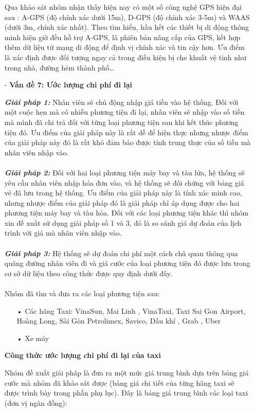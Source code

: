\documentclass[a4paper]{article}
\begin{document}
\begin{itemize}
    Qua khảo sát nhóm nhận thấy hiện nay có một số công nghệ GPS hiện đại sau : A-GPS (độ chính xác dưới 15m), D-GPS (độ chính xác 3-5m) và WAAS (dưới 3m, chính xác nhất). Theo tìm hiểu, hầu hết các thiết bị di động thông minh hiện giờ đều hỗ trợ A-GPS, là phiên bản nâng cấp của GPS,  kết hợp thêm dữ liệu từ mạng di động để định vị chính xác và tin cậy hơn. Ưu điểm là xác định được đối tượng ngay cả trong điều kiện bị che khuất vệ tinh như trong nhà, đường hẻm thành phố…
    \item[-] \textbf{Vấn đề 7: Ước lượng chi phí đi lại}\par
    \textit{\textbf{Giải pháp 1:}} Nhân viên sẽ chủ động nhập giá tiền vào hệ thống. Đối với một cuộc hẹn mà có nhiều phương tiện đi lại, nhân viên sẽ nhập vào số tiền mà mình đã chi trả đối với từng loại phương tiện sau khi kết thúc phương tiện đó. Ưu điểm của giải pháp này là rất dễ để hiện thực nhưng nhược điểm của giải pháp này đó là rất khó đảm bảo được tính trung thực của số tiền mà nhân viên nhập vào.\\
    \\
    \textit{\textbf{Giải pháp 2:}} Đối với hai loại phương tiện máy bay và tàu lửa, hệ thống sẽ yêu cầu nhân viên nhập hóa đơn vào, và hệ thống sẽ đối chứng với bảng giá vé đã lưu trong hệ thống. Ưu điểm của giải pháp này là tính xác minh cao, nhưng nhược điểm của giải pháp đó là giải pháp chỉ áp dụng được cho hai phương tiện máy bay và tàu hỏa. Đối với các loại phương tiện khác thì nhóm xin đề xuất sử dụng giải pháp số 1 và 3, đó là so sánh giá dự đoán của lịch trình với giá mà nhân viên nhập vào. \\
    \\
    \textit{\textbf{Giải pháp 3:}} Hệ thống sẽ dự đoán chi phí một cách chủ quan thông qua quãng đường nhân viên đi và giá cước của loại phương tiện đó được lưu trong cơ sở dữ liệu theo công thức được quy định dưới đây.\\
    \\     
    Nhóm đã tìm và đưa ra các loại phương tiện sau:
    \begin{itemize}  
        \item[•] Các hãng Taxi: VinaSun, Mai Linh , VinaTaxi, Taxi Sai Gon Airport, Hoàng    Long, Sài Gòn Petrolimex, Savico, Dầu khí , Grab , Uber
        \item[•] Xe máy
    \end{itemize}
    \textbf{Công thức ước lượng chi phí đi lại của taxi}\par
    Nhóm đề xuất giải pháp là đưa ra một mức giá trung bình dựa trên bảng giá cước mà nhóm đã khảo sát được (bảng giá chi tiết của từng hãng taxi sẽ được trình bày trong phần phụ lục). Đây là bảng giá trung bình các loại taxi (đơn vị ngàn đồng):\\   

\end{itemize}
\end{document}
